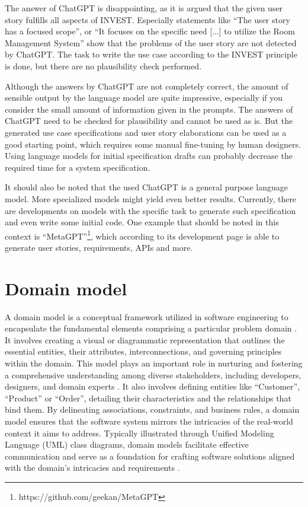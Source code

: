 \documentclass[conference,onecolumn]{IEEEtran}
\begin{document}
The answer of ChatGPT is disappointing, as it is argued that the given user story fulfills all aspects of INVEST. Especially statements like ``The user story has a focused scope'', or ``It focuses on the specific need [...] to utilize the Room Management System'' show that the problems of the user story are not detected by ChatGPT. The task to write the use case according to the INVEST principle is done, but there are no plausibility check performed.

Although the answers by ChatGPT are not completely correct, the amount of sensible output by the language model are quite impressive, especially if you consider the small amount of information given in the prompts.
The answers of ChatGPT need to be checked for plausibility and cannot be used as is. But the generated use case specifications and user story elaborations can be used as a good starting point, which requires some manual fine-tuning by human designers. Using language models for initial specification drafts can probably decrease the required time for a system specification.

It should also be noted that the used ChatGPT is a general purpose language model. More specialized models might yield even better results.
Currently, there are developments on models with the specific task to generate such specification and even write some initial code. One example that should be noted in this context is ``MetaGPT''\footnote{https://github.com/geekan/MetaGPT}, which according to its development page is able to generate user stories, requirements, APIs and more.




\section{Domain model}
	A domain model is a conceptual framework utilized in software engineering to encapsulate the fundamental elements comprising a particular problem domain \cite{larman2012applying}. It involves creating a visual or diagrammatic representation that outlines the essential entities, their attributes, interconnections, and governing principles within the domain. This model plays an important role in nurturing and fostering a comprehensive understanding among diverse stakeholders, including developers, designers, and domain experts \cite{fowler2004uml}. It also involves defining entities like ``Customer'', ``Product'' or ``Order'', detailing their characteristics and the relationships that bind them. By delineating associations, constraints, and business rules, a domain model ensures that the software system mirrors the intricacies of the real-world context it aims to address. Typically illustrated through Unified Modeling Language (UML) class diagrams, domain models facilitate effective communication and serve as a foundation for crafting software solutions aligned with the domain's intricacies and requirements \cite{booch1994oo}.
\end{document}
